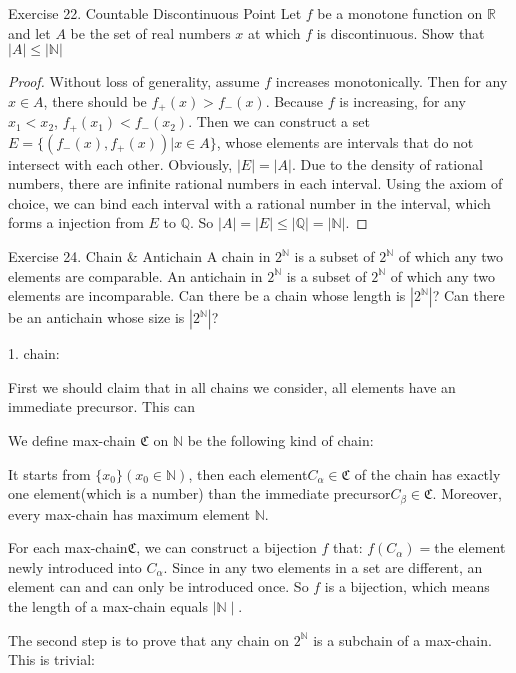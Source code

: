 \documentclass[UTF8, a4paper, linespread=1.5]{article}
\begin{document}
\begin{thm}{Exercise 22. Countable Discontinuous Point}{}
	 Let $f$ be a monotone function on $\mathbb{R}$ and let $A$ be the set of real numbers $x$ at which $f$ is discontinuous. Show that $|A| \le |\mathbb{N}|$
\end{thm}

\begin{proof}
	Without loss of generality, assume $f$ increases monotonically. Then for any $x \in A$, there should be $ f_+(x) > f_-(x)$. Because $f$ is increasing, for any $x_1 < x_2$, $ f_+(x_1) < f_-(x_2)$. Then we can construct a set $E=\{(f_-(x),f_+(x)) | x\in A\}$, whose elements are intervals that do not intersect with each other. Obviously, $|E|=|A|$. Due to the density of rational numbers, there are infinite rational numbers in each interval. Using the axiom of choice, we can bind each interval with a rational number in the interval, which forms a injection from $E$ to $\mathbb{Q}$. So $|A|=|E|\le|\mathbb{Q}|=|\mathbb{N}|$.
\end{proof}

\begin{thm}{Exercise 24. Chain \& Antichain}{}
   A chain in $2^\mathbb{N} $ is a subset of $2^\mathbb{N} $ of which any two elements are comparable. An antichain in $2^\mathbb{N} $ is a subset of $2^\mathbb{N} $ of which any two elements are incomparable. Can there be a chain whose length is $|2^\mathbb{N} |$? Can there be an antichain whose size is $|2^\mathbb{N} |$? 
\end{thm}
1. chain:

First we should claim that in all chains we consider, all elements have an immediate precursor. 
This can

We define max-chain $\mathfrak C$ on $\mathbb N$ be the following kind of chain: 

It starts from $\{x_0\}(x_0\in\mathbb N)$, then each element$C_\alpha\in\mathfrak C$ of the chain has 
exactly one element(which is a number) than the immediate precursor$C_\beta\in\mathfrak C$. 
Moreover, every max-chain has maximum element $\mathbb N$. 

For each max-chain$\mathfrak C$, we can construct a bijection $f$ that: $f(C_\alpha)=$the element newly 
introduced into $C_\alpha$. Since in any two elements in a set are different, 
an element can and can only be introduced once. So $f$ is a bijection, 
which means the length of a max-chain equals $\mid\mathbb N\mid$. 

The second step is to prove that any chain on $2^{\mathbb N}$ is a subchain of a max-chain. This is trivial: 
\end{document}
